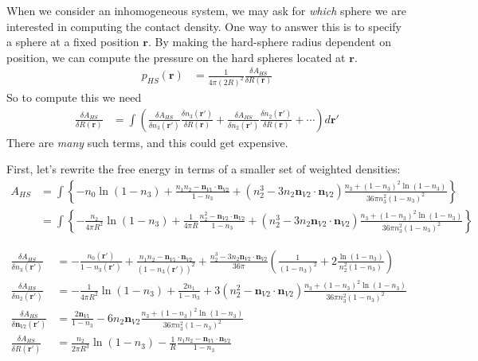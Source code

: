 \documentclass[letterpaper,twocolumn,amsmath,amssymb,prb]{revtex4-1}
\begin{document}
\begin{widetext}
When we consider an inhomogeneous system, we may ask for \emph{which}
sphere we are interested in computing the contact density.  One way to
answer this is to specify a sphere at a fixed position $\mathbf{r}$.
By making the hard-sphere radius dependent on position, we can compute
the pressure on the hard spheres located at $\mathbf{r}$.
\begin{align}
  p_{HS}(\mathbf{r}) &= \frac{1}{4\pi (2R)^2} \frac{\delta A_{HS}}{\delta R(\mathbf{r})}
\end{align}
So to compute this we need
\begin{align}
  \frac{\delta A_{HS}}{\delta R(\mathbf{r})} &=
  \int \left(
  \frac{\delta A_{HS}}{\delta n_3(\mathbf{r}')}
  \frac{\delta n_3(\mathbf{r}')}{\delta R(\mathbf{r})}
  +
  \frac{\delta A_{HS}}{\delta n_2(\mathbf{r}')}
  \frac{\delta n_2(\mathbf{r}')}{\delta R(\mathbf{r})}
  + \cdots
  \right) d\mathbf{r}'
\end{align}
There are \emph{many} such terms, and this could get expensive.

  First, let's rewrite the free energy in terms of a smaller set of
  weighted densities:
  \begin{align}
    A_{HS} &= \int \left\{
      -n_0 \ln\left( 1 - n_3\right)
      + \frac{n_1 n_2 - \mathbf{n}_{V1} \cdot\mathbf{n}_{V2}}{1-n_3}
      + (n_2^3 - 3 n_2 \mathbf{n}_{V2} \cdot \mathbf{n}_{V2}) \frac{
        n_3 + (1-n_3)^2 \ln(1-n_3)
      }{
        36\pi n_3^2(1-n_3)^2
      }
    \right\}
    \\
    &= \int \left\{
      -\frac{n_2}{4\pi R^2} \ln\left( 1 - n_3\right)
      + \frac{1}{4\pi R} \frac{n_2^2 - \mathbf{n}_{V2} \cdot\mathbf{n}_{V2}}{1-n_3}
      + (n_2^3 - 3 n_2 \mathbf{n}_{V2} \cdot \mathbf{n}_{V2}) \frac{
        n_3 + (1-n_3)^2 \ln(1-n_3)
      }{
        36\pi n_3^2(1-n_3)^2
      }
    \right\}
\end{align}

\begin{align}
    \frac{\delta A_{HS}}{\delta n_3(\mathbf{r}')} &=
    -\frac{n_0(\mathbf{r}')}{1 - n_3(\mathbf{r}')}
    + \frac{n_1n_2 - \mathbf{n}_{V1}\cdot\mathbf{n}_{V2}}{(1 -
      n_3(\mathbf{r}'))^2}
    + \frac{n_2^3 -
      3n_2\mathbf{n}_{V2}\cdot\mathbf{n}_{V2}}{36\pi}\left(
      \frac{1}{(1-n_3)^2} + 2\frac{\ln(1-n_3)}{n_2^2(1-n_3)}
    \right)
    \\
    \frac{\delta A_{HS}}{\delta n_2(\mathbf{r}')} &=
    -\frac{1}{4\pi R^2} \ln\left( 1 - n_3\right)
    +  \frac{2n_1}{1-n_3}
    + 3(n_2^2 - \mathbf{n}_{V2}\cdot\mathbf{n}_{V2})\frac{n_3 +
      (1-n_3)^2\ln(1-n_3)}{
      36\pi n_3^2(1-n_3)^2
    }
    \\
    \frac{\delta A_{HS}}{\delta \mathbf{n}_{V2}(\mathbf{r}')} &=
    \frac{2\mathbf{n}_{V1}}{1-n_3}
    - 6 n_2 \mathbf{n}_{V2} \frac{n_3 +
      (1-n_3)^2\ln(1-n_3)}{
      36\pi n_3^2(1-n_3)^2
    }    \\
    \frac{\delta A_{HS}}{\delta R(\mathbf{r}')} &=
    \frac{n_2}{2\pi R^3} \ln\left( 1 - n_3\right)
    - \frac1{R} \frac{n_1n_2 - \mathbf{n}_{V1} \cdot\mathbf{n}_{V2}}{1-n_3}
  \end{align}


\end{widetext}
\end{document}
